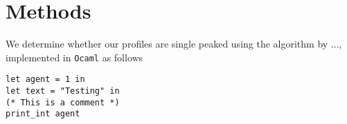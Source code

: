 \chapter{Methods}
\label{Methods}

We determine whether our profiles are single peaked using the algorithm by ..., implemented in \texttt{Ocaml} as follows

\begin{lstlisting}[language=caml]
let agent = 1 in
let text = "Testing" in
(* This is a comment *)
print_int agent
\end{lstlisting}
